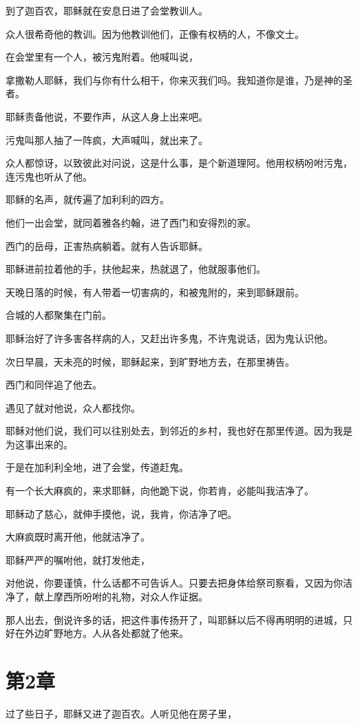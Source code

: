 \documentclass[12pt,oneside]{book}
\begin{document}
到了迦百农，耶稣就在安息日进了会堂教训人。

众人很希奇他的教训。因为他教训他们，正像有权柄的人，不像文士。

在会堂里有一个人，被污鬼附着。他喊叫说，

拿撒勒人耶稣，我们与你有什么相干，你来灭我们吗。我知道你是谁，乃是神的圣者。

耶稣责备他说，不要作声，从这人身上出来吧。

污鬼叫那人抽了一阵疯，大声喊叫，就出来了。

众人都惊讶，以致彼此对问说，这是什么事，是个新道理阿。他用权柄吩咐污鬼，连污鬼也听从了他。

耶稣的名声，就传遍了加利利的四方。

他们一出会堂，就同着雅各约翰，进了西门和安得烈的家。

西门的岳母，正害热病躺着。就有人告诉耶稣。

耶稣进前拉着他的手，扶他起来，热就退了，他就服事他们。

天晚日落的时候，有人带着一切害病的，和被鬼附的，来到耶稣跟前。

合城的人都聚集在门前。

耶稣治好了许多害各样病的人，又赶出许多鬼，不许鬼说话，因为鬼认识他。

次日早晨，天未亮的时候，耶稣起来，到旷野地方去，在那里祷告。

西门和同伴追了他去。

遇见了就对他说，众人都找你。

耶稣对他们说，我们可以往别处去，到邻近的乡村，我也好在那里传道。因为我是为这事出来的。

于是在加利利全地，进了会堂，传道赶鬼。

有一个长大麻疯的，来求耶稣，向他跪下说，你若肯，必能叫我洁净了。

耶稣动了慈心，就伸手摸他，说，我肯，你洁净了吧。

大麻疯既时离开他，他就洁净了。

耶稣严严的嘱咐他，就打发他走，

对他说，你要谨慎，什么话都不可告诉人。只要去把身体给祭司察看，又因为你洁净了，献上摩西所吩咐的礼物，对众人作证据。

那人出去，倒说许多的话，把这件事传扬开了，叫耶稣以后不得再明明的进城，只好在外边旷野地方。人从各处都就了他来。

\chapter{第2章}
过了些日子，耶稣又进了迦百农。人听见他在房子里，
\end{document}
